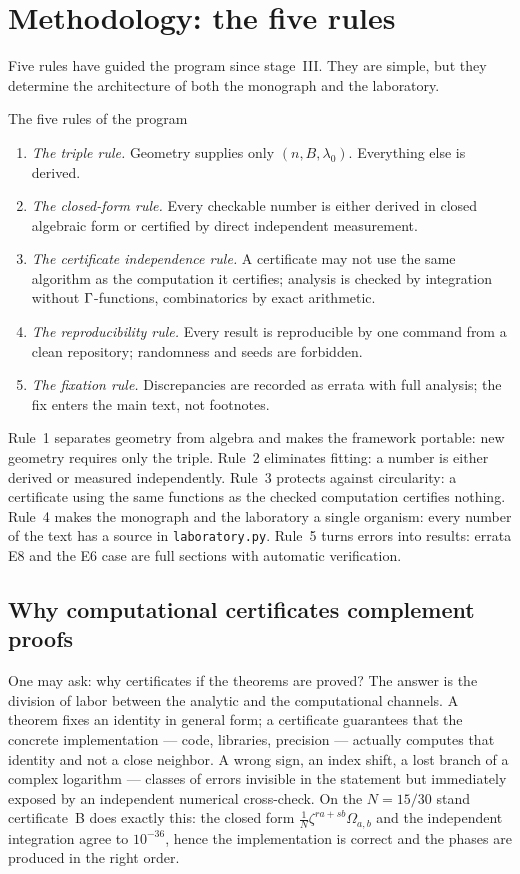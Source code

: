 \section{Methodology: the five rules}\label{sec:rules}

Five rules have guided the program since stage~III. They are simple,
but they determine the architecture of both the monograph and the
laboratory.

\begin{keybox}{The five rules of the program}
\begin{enumerate}[leftmargin=2em, itemsep=0.2em]
\item \emph{The triple rule.} Geometry supplies only
  $(n,B,\lambda_0)$. Everything else is derived.
\item \emph{The closed-form rule.} Every checkable number is either
  derived in closed algebraic form or certified by direct
  independent measurement.
\item \emph{The certificate independence rule.} A certificate may
  not use the same algorithm as the computation it certifies;
  analysis is checked by integration without $\Gamma$-functions,
  combinatorics by exact arithmetic.
\item \emph{The reproducibility rule.} Every result is reproducible
  by one command from a clean repository; randomness and seeds are
  forbidden.
\item \emph{The fixation rule.} Discrepancies are recorded as errata
  with full analysis; the fix enters the main text, not footnotes.
\end{enumerate}
\end{keybox}

Rule~1 separates geometry from algebra and makes the framework
portable: new geometry requires only the triple. Rule~2 eliminates
fitting: a number is either derived or measured independently.
Rule~3 protects against circularity: a certificate using the same
functions as the checked computation certifies nothing. Rule~4 makes
the monograph and the laboratory a single organism: every number of
the text has a source in \texttt{laboratory.py}. Rule~5 turns errors
into results: errata E8 and the E6 case are full sections with
automatic verification.

\subsection{Why computational certificates complement proofs}

One may ask: why certificates if the theorems are proved? The answer
is the division of labor between the analytic and the computational
channels. A theorem fixes an identity in general form; a certificate
guarantees that the concrete implementation --- code, libraries,
precision --- actually computes that identity and not a close
neighbor. A wrong sign, an index shift, a lost branch of a complex
logarithm --- classes of errors invisible in the statement but
immediately exposed by an independent numerical cross-check. On the
$N=15/30$ stand certificate~B does exactly this: the closed form
$\frac1N\zeta^{ra+sb}\Omega_{a,b}$ and the independent integration
agree to $10^{-36}$, hence the implementation is correct and the
phases are produced in the right order.

